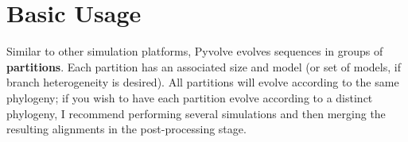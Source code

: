 \documentclass{article}
\begin{document}


\setlength{\parskip}{12pt}
\section{Basic Usage}

Similar to other simulation platforms, Pyvolve evolves sequences in groups of \textbf{partitions}. Each partition has an associated size and model (or set of models, if branch heterogeneity is desired). All partitions will evolve according to the same phylogeny; if you wish to have each partition evolve according to a distinct phylogeny, I recommend performing several simulations and then merging the resulting alignments in the post-processing stage. 
\end{document}
